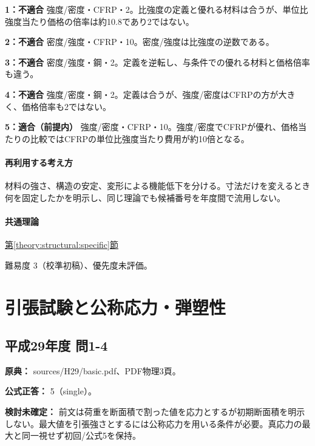 \noindent\textbf{1：不適合} 強度/密度・CFRP・2。比強度の定義と優れる材料は合うが、単位比強度当たり価格の倍率は約10.8であり2ではない。\par

\noindent\textbf{2：不適合} 密度/強度・CFRP・10。密度/強度は比強度の逆数である。\par

\noindent\textbf{3：不適合} 密度/強度・鋼・2。定義を逆転し、与条件での優れる材料と価格倍率も違う。\par

\noindent\textbf{4：不適合} 強度/密度・鋼・2。定義は合うが、強度/密度はCFRPの方が大きく、価格倍率も2ではない。\par

\noindent\textbf{5：適合（前提内）} 強度/密度・CFRP・10。強度/密度でCFRPが優れ、価格当たりの比較ではCFRPの単位比強度当たり費用が約10倍となる。\par

\paragraph{再利用する考え方} 材料の強さ、構造の安定、変形による機能低下を分ける。寸法だけを変えるとき何を固定したかを明示し、同じ理論でも候補番号を年度間で流用しない。

\paragraph{共通理論} \hyperref[theory:structural:specific]{第\ref*{theory:structural:specific}節}

\par 難易度 3（校準初稿）、優先度未評価。

\section{引張試験と公称応力・弾塑性}

\subsection{平成29年度 問1-4}
\label{q:h29-reg-basic-1-4}

\noindent\textbf{原典：} sources/H29/basic.pdf、PDF物理3頁。

\textbf{公式正答：} 5（single）。

\par\textbf{検討未確定：} 前文は荷重を断面積で割った値を応力とするが初期断面積を明示しない。最大値を引張強さとするには公称応力を用いる条件が必要。真応力の最大と同一視せず初回/公式5を保持。

